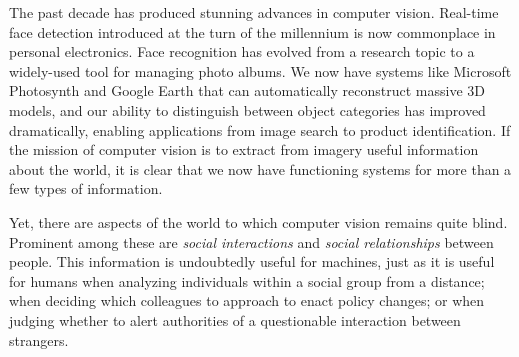 \pagestyle{plain} 

 \label{sec:intro}



The past decade has produced stunning advances in computer vision. Real-time face detection introduced at the turn of the millennium is now commonplace in personal electronics. Face recognition has evolved from a research topic to a widely-used tool for managing photo albums. We now have systems like Microsoft Photosynth and Google Earth that can automatically reconstruct massive 3D models, and our ability to distinguish between object categories has improved dramatically, enabling applications from image search to product identification. If the mission of computer vision is to extract from imagery useful information about the world, it is clear that we now have functioning systems for more than a few types of information. 



Yet, there are aspects of the world to which computer vision remains quite blind. Prominent among these are \emph{social interactions} and \emph{social relationships} between people. This information is undoubtedly useful for machines, just as it is useful for humans when analyzing individuals within a social group from a distance; when deciding which colleagues to approach to enact policy changes; or when judging whether to alert authorities of a questionable interaction between strangers.


